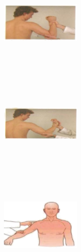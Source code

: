 \documentclass[a4paper,12pt,openany,oneside]{book}
\begin{document}
{\begin{figure}[H]
\begin{subfigure}[t]{.25\textwidth}
		\end{subfigure}
		\hspace{\fill}
		\begin{subfigure}[t]{.25\textwidth}
			\includegraphics[width=4cm,height=5cm]{./clinicalPhysioPic/motorSystem/flexorArm.jpg}
		\end{subfigure}
		\hspace{\fill}
		\begin{subfigure}[t]{.25\textwidth}
			\includegraphics[width=4cm,height=5cm]{./clinicalPhysioPic/motorSystem/extensorArm.jpg}
		\end{subfigure}
		\hspace{\fill}
		\begin{subfigure}[t]{.25\textwidth}
			\includegraphics[width=4cm,height=5cm]{./clinicalPhysioPic/motorSystem/deltoid.jpg}
		\end{subfigure}
		\hspace{\fill}

\end{figure}}
\end{document}
